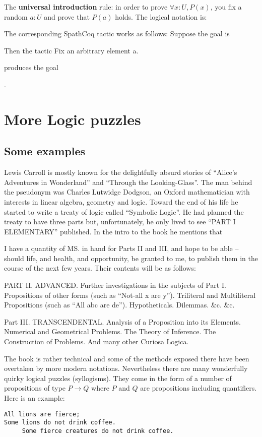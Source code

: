 The {\bf universal introduction} rule: in order to prove $\forall x:U, P(x)$, you fix a random $a:U$ and prove that $P(a)$ holds. The logical notation is:



The corresponding SpathCoq tactic  works as follows:
Suppose the goal is


Then the tactic 
Fix an arbitrary element a.

produces the goal

.

 \section{More Logic puzzles}
 \subsection{Some examples}
 
Lewis Carroll is mostly known for the delightfully absurd stories of ``Alice's Adventures in Wonderland'' and ``Through the Looking-Glass''. The man behind the pseudonym was Charles Lutwidge Dodgson, an Oxford mathematician with interests in linear algebra, geometry and logic. Toward the end of his life he started to write a  treaty of logic called ``Symbolic Logic''. He had planned the treaty to have three parts but, unfortunately, he only lived to see  ``PART I
ELEMENTARY'' published. In the intro to the book he mentions that 
{\quote I have a quantity of MS. in hand for Parts II and III, and hope to be able -- should life, and health, and opportunity, be granted to me, to publish them in the course of the next few years. Their contents will be as follows:

PART II. ADVANCED.
Further investigations in the subjects of Part I. Propositions of other forms (such as ``Not-all x are y''). Triliteral and Multiliteral Propositions (such as ``All abc are de''). Hypotheticals. Dilemmas. \&c. \&c.

Part III. TRANSCENDENTAL.
Analysis of a Proposition into its Elements. Numerical and Geometrical Problems. The Theory of Inference. The Construction of Problems. And many other Curiosa Logica.}


The book is rather technical and some of the methods exposed there have been overtaken by more modern notations. Nevertheless there are many wonderfully quirky  logical puzzles (syllogisms). They come in the form of a number of propositions of type $P \rightarrow Q$ where $P$ and $Q$ are propositions including quantifiers. Here is an example:
\begin{verbatim}
All lions are fierce;
Some lions do not drink coffee.
     Some fierce creatures do not drink coffee.
\end{verbatim}


